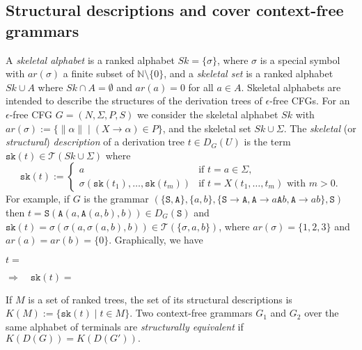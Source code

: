 \documentclass[preprint,12pt,english]{article}
\def\tS{\mathtt{S}}
\def\tA{\mathtt{A}}
\def\cT{\mathcal{T}}
\def\sk{\mathtt{sk}}
\begin{document}
\subsection*{Structural descriptions and cover context-free grammars}
A {\em skeletal alphabet} is a ranked alphabet  $Sk=\{\sigma\}$, where $\sigma$ is a special symbol with $ar(\sigma)$ a finite subset of $\mathbb{N}\setminus\{0\}$, and a {\em skeletal set} is a ranked alphabet $Sk\cup A$ where $Sk\cap A=\emptyset$ and $ar(a)=0$ for all $a\in A$. 
Skeletal alphabets are intended to describe the structures of the derivation trees of $\epsilon$-free CFGs. For an $\epsilon$-free CFG $G=(N,\Sigma,P,S)$ we consider the skeletal alphabet $Sk$ with $ar(\sigma):=\{\|\alpha\| \mid (X\to\alpha)\in P\}$, and the skeletal set $Sk\cup\Sigma.$
The {\em skeletal} (or {\em structural}) {\em description} of a derivation tree $t\in D_G(U)$ is the term $\sk(t)\in\cT(Sk\cup\Sigma)$ where 
$$\sk(t):=\left\{\begin{array}{ll}
a&\mbox{if }t=a\in \Sigma,\\
\sigma(\sk(t_1),\ldots,\sk(t_m))&\text{if }t=X(t_1,\ldots,t_m)\text{ with }m>0.
\end{array}\right.$$ 
For example, if $G$ is the grammar $(\{\tS,\tA\},\{a,b\},\{\tS\to \tA,\tA\to a\tA b,\tA\to ab\},\tS)$ then $t=\tS(\tA(a,\tA(a,b),b))\in D_G(\tS)$ and $\sk(t)=\sigma(\sigma(a,\sigma(a,b),b))\in\cT(\{\sigma,a,b\})$, where $ar(\sigma)=\{1,2,3\}$ and $ar(a)=ar(b)=\{0\}$. Graphically,  we have
\begin{center}
$t=$
\quad\qquad$\Rightarrow\quad\sk(t)=$
\end{center}
If $M$ is a set of ranked trees, the set of its structural descriptions is  $K(M):=\{\sk(t)\mid t\in M\}$. Two context-free grammars $G_1$ and $G_2$ over the same alphabet of terminals are {\em structurally equivalent} if $K(D(G))=K(D(G')).$
\end{document}
